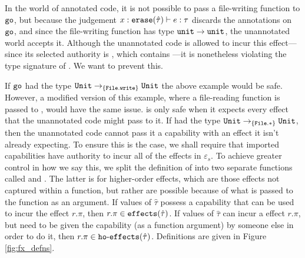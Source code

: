 In the world of annotated code, it is not possible to pass a
file-writing function to $\mathtt{go}$, but because the judgement
$x: \mathtt{erase}(\hat \tau) \vdash e: \tau$ discards the annotations on
$\mathtt{go}$, and since the file-writing function has type
$\mathtt{unit} \rightarrow \mathtt{unit}$, the unannotated world accepts it.
Although the unannotated code is allowed to incur this effect---since
its selected authority is , which contains
---it is nonetheless violating the type signature of .
We want to prevent this.

If $\mathtt{go}$ had the type $\mathtt{Unit} \rightarrow_{\{ \mathtt{File.write} \}} \mathtt{Unit}$
the above example would be safe. However, a modified version of this example,
where a file-reading function is passed to , would have the same issue.  is only safe when it expects every effect that the unannotated code
might pass to it. If  had the type $\mathtt{Unit} \rightarrow_{\{ \mathtt{File.*} \}} \mathtt{Unit}$, then the unannotated code cannot pass it a capability with an effect it isn't already expecting. To ensure this is the case, we shall require that imported
capabilities have authority to incur all of the effects in $\varepsilon_s$. To achieve
greater control in how we say this, we split the definition of  into
two separate functions called  and .
The latter is for higher-order effects, which are those effects not captured within a
function, but rather are possible because of what is passed to the function as an
argument. If values of $\hat \tau$ possess a capability that can be used to incur
the effect $r.\pi$, then $r.\pi \in \mathtt{effects}(\hat \tau)$. If values of $\hat \tau$ can incur a
effect $r.\pi$, but need to be given the capability (as a function argument) by
someone else in order to do it, then $r.\pi \in \mathtt{ho \hbox{-} effects}(\hat \tau)$. Definitions are
given in Figure \ref{fig:fx_defns}.

